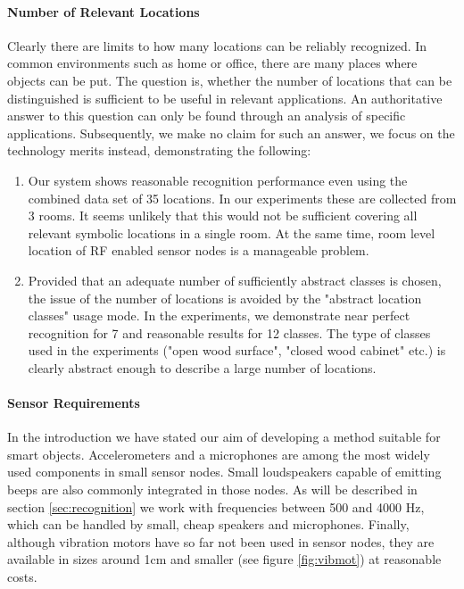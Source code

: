 \paragraph{Number of Relevant Locations}
Clearly there are limits to how many locations can be reliably
recognized. In common environments
such as home or office, there are many 
places where objects can be put. The question is, whether the
number of locations that can be distinguished is sufficient to be
useful in relevant applications. An authoritative answer to this
question can only be found through an analysis of specific 
applications. Subsequently, we make no claim for such an answer,
we focus on the technology merits instead, demonstrating the
following:
\begin{enumerate} 
\item Our system shows reasonable recognition performance even using
 the combined data set of 35 locations. In our experiments these are
 collected from 3 rooms. It seems unlikely that this would not
 be sufficient covering all relevant symbolic locations in a 
 single room. At the same time, room level location of RF enabled sensor nodes is a manageable problem. 
\item Provided that an adequate number of sufficiently abstract
 classes is chosen, the issue of the number of locations is avoided by the
 "abstract location classes" usage mode. In the experiments, we
 demonstrate near perfect recognition for 7 and reasonable results
 for 12 classes. The type of classes used in the experiments ("open
 wood surface", "closed wood cabinet" etc.) is clearly abstract
 enough to describe a large number of locations. 
\end{enumerate} 

\paragraph{Sensor Requirements}
In the introduction we have stated our aim of developing a method
suitable for smart objects. Accelerometers and a microphones are
among the most widely used components in small sensor nodes. Small
loudspeakers capable of emitting beeps are also commonly integrated in those
nodes. As will be described in section \ref{sec:recognition} 
we work with frequencies between 500 and 4000 Hz, which can be handled
by small, cheap speakers and microphones. Finally, although 
vibration motors have so far not been used in sensor nodes, they are
available in sizes around 1cm and smaller (see figure \ref{fig:vibmot})
at reasonable costs. 

